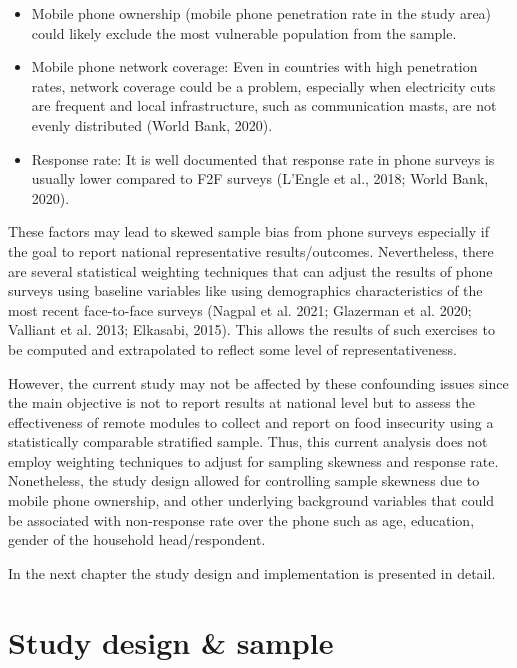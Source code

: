 \documentclass[11pt,harvard]{article}
\begin{document}
	\begin{itemize}[label=--, left=1.5em]
		\item[1.]	Mobile phone ownership (mobile phone penetration rate in the study area) could likely exclude the most vulnerable population from the sample. 
		\item[2.]	Mobile phone network coverage: Even in countries with high penetration rates, network coverage could be a problem, especially when electricity cuts are frequent and local infrastructure, such as communication masts, are not evenly distributed (World Bank, 2020).
		\item[3.]	Response rate: It is well documented that response rate in phone surveys is usually lower compared to F2F surveys (L’Engle et al., 2018; World Bank, 2020). 
	\end{itemize}
	
	These factors may lead to skewed sample bias from phone surveys especially if the goal to report national representative results/outcomes. Nevertheless, there are several statistical weighting techniques that can adjust the results of phone surveys using baseline variables like using demographics characteristics of the most recent face-to-face surveys (Nagpal et al. 2021; Glazerman et al. 2020; Valliant et al. 2013; Elkasabi, 2015). This allows the results of such exercises to be computed and extrapolated to reflect some level of representativeness. 
	
	However, the current study may not be affected by these confounding issues since the main objective is not to report results at national level but to assess the effectiveness of remote modules to collect and report on food insecurity using a statistically comparable stratified sample. Thus, this current analysis does not employ weighting techniques to adjust for sampling skewness and response rate. Nonetheless, the study design allowed for controlling sample skewness due to mobile phone ownership, and other underlying background variables that could be associated with non-response rate over the phone such as age, education, gender of the household head/respondent.
	
	In the next chapter the study design and implementation is presented in detail.
	 
	
	
	\pagebreak
	
	
	\section{Study design \& sample}
		
\end{document}
